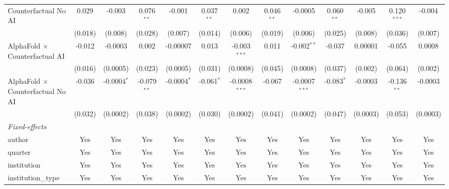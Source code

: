 \begin{tabular}{lcccccccccccc}
   Counterfactual No AI                     & 0.029         & -0.003        & 0.076$^{**}$  & -0.001        & 0.037$^{**}$ & 0.002           & 0.046$^{**}$ & -0.0005         & 0.060$^{**}$  & -0.005        & 0.120$^{***}$ & -0.004\\   
                                            & (0.018)       & (0.008)       & (0.028)       & (0.007)       & (0.014)      & (0.006)         & (0.019)      & (0.006)         & (0.025)       & (0.008)       & (0.036)       & (0.007)\\   
   AlphaFold $\times$ Counterfactual AI     & -0.012        & -0.0003       & 0.002         & -0.00007      & 0.013        & -0.003$^{***}$  & 0.011        & -0.002$^{**}$   & -0.037        & 0.00001       & -0.055        & 0.0008\\   
                                            & (0.016)       & (0.0005)      & (0.023)       & (0.0005)      & (0.031)      & (0.0008)        & (0.045)      & (0.0008)        & (0.037)       & (0.002)       & (0.064)       & (0.002)\\   
   AlphaFold $\times$ Counterfactual No AI  & -0.036        & -0.0004$^{*}$ & -0.079$^{**}$ & -0.0004$^{*}$ & -0.061$^{*}$ & -0.0008$^{***}$ & -0.067       & -0.0007$^{***}$ & -0.083$^{*}$  & -0.0003       & -0.136$^{**}$ & -0.0003\\   
                                            & (0.032)       & (0.0002)      & (0.038)       & (0.0002)      & (0.030)      & (0.0002)        & (0.041)      & (0.0002)        & (0.047)       & (0.0003)      & (0.053)       & (0.0003)\\   
   \midrule
   \emph{Fixed-effects}\\
   author                                   & Yes           & Yes           & Yes           & Yes           & Yes          & Yes             & Yes          & Yes             & Yes           & Yes           & Yes           & Yes\\  
   quarter                                  & Yes           & Yes           & Yes           & Yes           & Yes          & Yes             & Yes          & Yes             & Yes           & Yes           & Yes           & Yes\\  
   institution                              & Yes           & Yes           & Yes           & Yes           & Yes          & Yes             & Yes          & Yes             & Yes           & Yes           & Yes           & Yes\\  
   institution\_type                        & Yes           & Yes           & Yes           & Yes           & Yes          & Yes             & Yes          & Yes             & Yes           & Yes           & Yes           & Yes\\  

\end{tabular}
